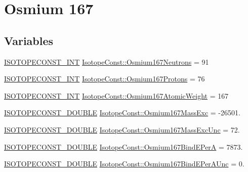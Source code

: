 \hypertarget{group___isotope_const-_osmium-_os167}{}\section{Osmium 167}
\label{group___isotope_const-_osmium-_os167}
\subsection*{Variables}
\begin{DoxyCompactItemize}
\item 
\mbox{\hyperlink{group___isotope_const-_macros_ga5f18360b3e99483a35c32d789e62621c}{I\+S\+O\+T\+O\+P\+E\+C\+O\+N\+S\+T\+\_\+\+I\+NT}} \mbox{\hyperlink{group___isotope_const-_osmium-_os167_gac5f31c7cc15eaefefbb987ad016b1016}{Isotope\+Const\+::\+Osmium167\+Neutrons}} = 91
\item 
\mbox{\hyperlink{group___isotope_const-_macros_ga5f18360b3e99483a35c32d789e62621c}{I\+S\+O\+T\+O\+P\+E\+C\+O\+N\+S\+T\+\_\+\+I\+NT}} \mbox{\hyperlink{group___isotope_const-_osmium-_os167_ga0791f5443c1f17dc150a84d8f81a7300}{Isotope\+Const\+::\+Osmium167\+Protons}} = 76
\item 
\mbox{\hyperlink{group___isotope_const-_macros_ga5f18360b3e99483a35c32d789e62621c}{I\+S\+O\+T\+O\+P\+E\+C\+O\+N\+S\+T\+\_\+\+I\+NT}} \mbox{\hyperlink{group___isotope_const-_osmium-_os167_ga05619135e44b0fca13c9debaf6ab58ed}{Isotope\+Const\+::\+Osmium167\+Atomic\+Weight}} = 167
\item 
\mbox{\hyperlink{group___isotope_const-_macros_ga8f45a7272ce02c0b4c65c44636ed719a}{I\+S\+O\+T\+O\+P\+E\+C\+O\+N\+S\+T\+\_\+\+D\+O\+U\+B\+LE}} \mbox{\hyperlink{group___isotope_const-_osmium-_os167_ga6d39674abb665c2f035f9c712564eb70}{Isotope\+Const\+::\+Osmium167\+Mass\+Exc}} = -\/26501.
\item 
\mbox{\hyperlink{group___isotope_const-_macros_ga8f45a7272ce02c0b4c65c44636ed719a}{I\+S\+O\+T\+O\+P\+E\+C\+O\+N\+S\+T\+\_\+\+D\+O\+U\+B\+LE}} \mbox{\hyperlink{group___isotope_const-_osmium-_os167_ga14d38b9d82ecf18e00e17fc5a2d8b339}{Isotope\+Const\+::\+Osmium167\+Mass\+Exc\+Unc}} = 72.
\item 
\mbox{\hyperlink{group___isotope_const-_macros_ga8f45a7272ce02c0b4c65c44636ed719a}{I\+S\+O\+T\+O\+P\+E\+C\+O\+N\+S\+T\+\_\+\+D\+O\+U\+B\+LE}} \mbox{\hyperlink{group___isotope_const-_osmium-_os167_gae01c761b289cca79e813525bfec2d3a3}{Isotope\+Const\+::\+Osmium167\+Bind\+E\+PerA}} = 7873.
\item 
\mbox{\hyperlink{group___isotope_const-_macros_ga8f45a7272ce02c0b4c65c44636ed719a}{I\+S\+O\+T\+O\+P\+E\+C\+O\+N\+S\+T\+\_\+\+D\+O\+U\+B\+LE}} \mbox{\hyperlink{group___isotope_const-_osmium-_os167_gaf1b5472dbb10dfd26ca9fbd1b0804372}{Isotope\+Const\+::\+Osmium167\+Bind\+E\+Per\+A\+Unc}} = 0.

\end{DoxyCompactItemize}
